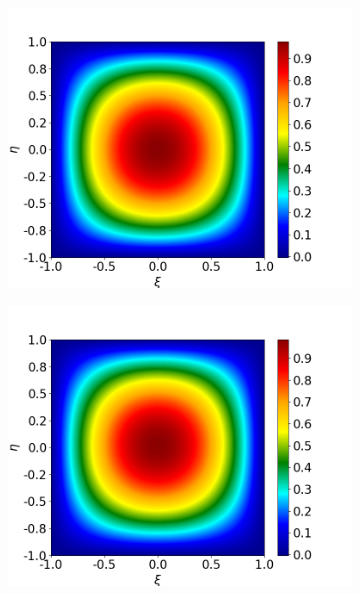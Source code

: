 \documentclass[preprint,12pt]{elsarticle}
\begin{document}
\begin{figure}
	\centering
	\begin{subfigure}[b]{0.49\textwidth}
		\centering
		\includegraphics[width=\textwidth]{figs/otho0.png}
		\caption[]%
		{{\small }}    
		\label{fig:otho0}
	\end{subfigure}
	\hfill
	\begin{subfigure}[b]{0.49\textwidth}  
		\centering 
		\includegraphics[width=\textwidth]{figs/otho1.png}
		\caption[]%
		{{\small }}    
		\label{fig:otho1}
	\end{subfigure}
	\vfill
	\begin{subfigure}[b]{0.49\textwidth}   

\end{subfigure}
\end{figure}
\end{document}
